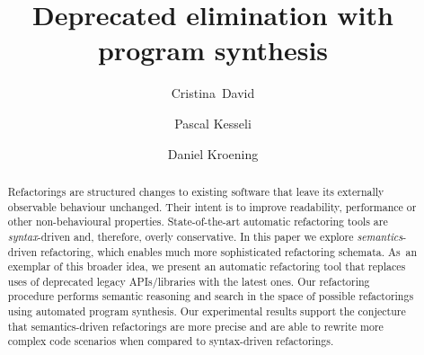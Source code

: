 \documentclass[runningheads,a4paper]{llncs}
\begin{document}




\title{Deprecated elimination with program synthesis}

\author{
\mbox{Cristina David} \and
Pascal Kesseli \and
Daniel Kroening}





\maketitle

\begin{abstract}
%
  Refactorings are structured changes to existing software that leave its
  externally observable behaviour unchanged.  Their intent is to improve
  readability, performance or other non-behavioural properties. 
  State-of-the-art automatic refactoring tools are {\em syntax}-driven and,
  therefore, overly conservative.  In this paper we explore {\em
  semantics}-driven refactoring, which enables much more sophisticated
  refactoring schemata.  As~an exemplar of this broader idea, we present
  an automatic refactoring tool that replaces uses of deprecated legacy APIs/libraries
  with the latest ones.
  Our refactoring procedure performs
  semantic reasoning and search in the space of possible refactorings using
  automated program synthesis.  Our experimental results support the
  conjecture that semantics-driven refactorings are more precise and are
  able to rewrite more complex code scenarios when compared to syntax-driven
  refactorings.
%
\end{abstract}
\end{document}
